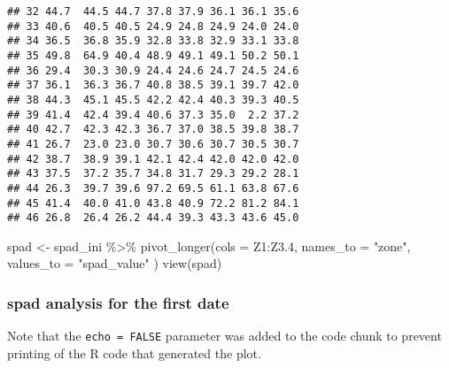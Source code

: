 \documentclass[
]{article}
\newenvironment{Shaded}{\begin{snugshade}}{\end{snugshade}}
\newcommand{\AttributeTok}[1]{\textcolor[rgb]{0.77,0.63,0.00}{#1}}
\newcommand{\FloatTok}[1]{\textcolor[rgb]{0.00,0.00,0.81}{#1}}
\newcommand{\FunctionTok}[1]{\textcolor[rgb]{0.00,0.00,0.00}{#1}}
\newcommand{\NormalTok}[1]{#1}
\newcommand{\OtherTok}[1]{\textcolor[rgb]{0.56,0.35,0.01}{#1}}
\newcommand{\SpecialCharTok}[1]{\textcolor[rgb]{0.00,0.00,0.00}{#1}}
\newcommand{\StringTok}[1]{\textcolor[rgb]{0.31,0.60,0.02}{#1}}
\begin{document}
\begin{verbatim}
## 32 44.7  44.5 44.7 37.8 37.9 36.1 36.1 35.6
## 33 40.6  40.5 40.5 24.9 24.8 24.9 24.0 24.0
## 34 36.5  36.8 35.9 32.8 33.8 32.9 33.1 33.8
## 35 49.8  64.9 40.4 48.9 49.1 49.1 50.2 50.1
## 36 29.4  30.3 30.9 24.4 24.6 24.7 24.5 24.6
## 37 36.1  36.3 36.7 40.8 38.5 39.1 39.7 42.0
## 38 44.3  45.1 45.5 42.2 42.4 40.3 39.3 40.5
## 39 41.4  42.4 39.4 40.6 37.3 35.0  2.2 37.2
## 40 42.7  42.3 42.3 36.7 37.0 38.5 39.8 38.7
## 41 26.7  23.0 23.0 30.7 30.6 30.7 30.5 30.7
## 42 38.7  38.9 39.1 42.1 42.4 42.0 42.0 42.0
## 43 37.5  37.2 35.7 34.8 31.7 29.3 29.2 28.1
## 44 26.3  39.7 39.6 97.2 69.5 61.1 63.8 67.6
## 45 41.4  40.0 41.0 43.8 40.9 72.2 81.2 84.1
## 46 26.8  26.4 26.2 44.4 39.3 43.3 43.6 45.0
\end{verbatim}

\begin{Shaded}
\begin{Highlighting}[]
\NormalTok{spad }\OtherTok{\textless{}{-}}\NormalTok{ spad\_ini }\SpecialCharTok{\%\textgreater{}\%}
  \FunctionTok{pivot\_longer}\NormalTok{(}\AttributeTok{cols =}\NormalTok{ Z1}\SpecialCharTok{:}\NormalTok{Z3}\FloatTok{.4}\NormalTok{, }
               \AttributeTok{names\_to =} \StringTok{"zone"}\NormalTok{, }\AttributeTok{values\_to =} \StringTok{"spad\_value"}\NormalTok{ )}
\FunctionTok{view}\NormalTok{(spad)}
\end{Highlighting}
\end{Shaded}

\hypertarget{spad-analysis-for-the-first-date}{%
\subsubsection{spad analysis for the first
date}\label{spad-analysis-for-the-first-date}}

Note that the \texttt{echo\ =\ FALSE} parameter was added to the code
chunk to prevent printing of the R code that generated the plot.
\end{document}
